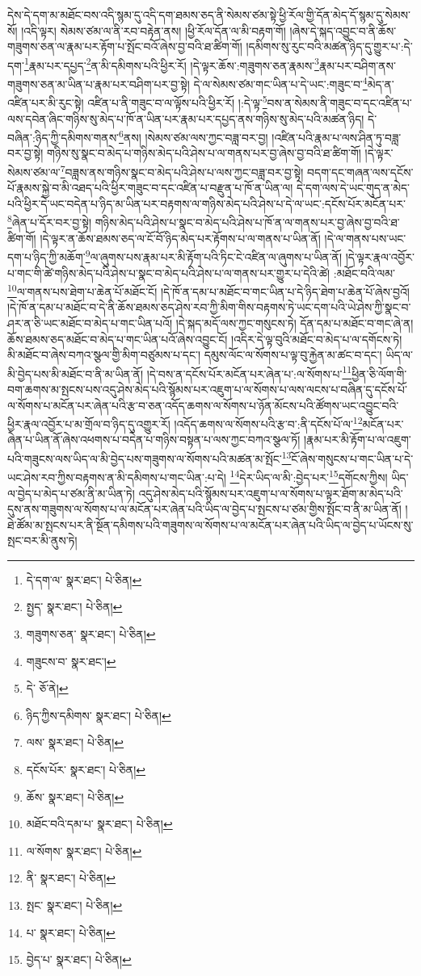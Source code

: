 དེས་དེ་དག་མ་མཐོང་བས་འདི་སྙམ་དུ་འདི་དག་ཐམས་ཅད་ནི་སེམས་ཙམ་སྟེ་ཕྱི་རོལ་གྱི་དོན་མེད་དོ་སྙམ་དུ་སེམས་སོ། །འདི་ལྟར། སེམས་ཙམ་ལ་ནི་རབ་བརྟེན་ནས། །ཕྱི་རོལ་དོན་ལ་མི་བརྟག་གོ། །ཞེས་དེ་སྐད་འབྱུང་བ་ནི་ཆོས་གཟུགས་ཅན་ལ་རྣམ་པར་རྟོག་པ་སྤོང་བའོ་ཞེས་བྱ་བའི་ཐ་ཚིག་གོ། །དམིགས་སུ་རུང་བའི་མཚན་ཉིད་དུ་གྱུར་པ་:དེ་དག་\footnote{དེ་དག་ལ་  སྣར་ཐང་།  པེ་ཅིན། }རྣམ་པར་དཔྱད་\footnote{སྤྱད་  སྣར་ཐང་།  པེ་ཅིན། }ན་མི་དམིགས་པའི་ཕྱིར་རོ། །དེ་ལྟར་ཆོས་:གཟུགས་ཅན་རྣམས་\footnote{གཟུགས་ཅན་  སྣར་ཐང་།  པེ་ཅིན། }རྣམ་པར་བཤིག་ནས་གཟུགས་ཅན་མ་ཡིན་པ་རྣམ་པར་བཤིག་པར་བྱ་སྟེ། དེ་ལ་སེམས་ཙམ་གང་ཡིན་པ་དེ་ཡང་:གཟུང་བ་\footnote{གཟུངས་བ་  སྣར་ཐང་། }མེད་ན་འཛིན་པར་མི་རུང་སྟེ། འཛིན་པ་ནི་གཟུང་བ་ལ་ལྟོས་པའི་ཕྱིར་རོ། །:དེ་ལྟ་\footnote{དེ་  ཅོ་ནེ། }བས་ན་སེམས་ནི་གཟུང་བ་དང་འཛིན་པ་ལས་དབེན་ཞིང་གཉིས་སུ་མེད་པ་ཁོ་ན་ཡིན་པར་རྣམ་པར་དཔྱད་ནས་གཉིས་སུ་མེད་པའི་མཚན་ཉིད། དེ་བཞིན་:ཉིད་ཀྱི་དམིགས་གནས་\footnote{ཉིད་ཀྱིས་དམིགས་  སྣར་ཐང་།  པེ་ཅིན། }ནས། །སེམས་ཙམ་ལས་ཀྱང་བཟླ་བར་བྱ། །འཛིན་པའི་རྣམ་པ་ལས་ཤིན་ཏུ་བཟླ་བར་བྱ་སྟེ། གཉིས་སུ་སྣང་བ་མེད་པ་གཉིས་མེད་པའི་ཤེས་པ་ལ་གནས་པར་བྱ་ཞེས་བྱ་བའི་ཐ་ཚིག་གོ། །དེ་ལྟར་སེམས་ཙམ་ལ་\footnote{ལས་  སྣར་ཐང་།  པེ་ཅིན། }བཟླས་ནས་གཉིས་སྣང་བ་མེད་པའི་ཤེས་པ་ལས་ཀྱང་བཟླ་བར་བྱ་སྟེ། བདག་དང་གཞན་ལས་དངོས་པོ་རྣམས་སྐྱེ་བ་མི་འཐད་པའི་ཕྱིར་གཟུང་བ་དང་འཛིན་པ་བརྫུན་པ་ཁོ་ན་ཡིན་ལ། དེ་དག་ལས་དེ་ཡང་གུད་ན་མེད་པའི་ཕྱིར་དེ་ཡང་བདེན་པ་ཉིད་མ་ཡིན་པར་བརྟགས་ལ་གཉིས་མེད་པའི་ཤེས་པ་དེ་ལ་ཡང་:དངོས་པོར་མངོན་པར་\footnote{དངོས་པོར་  སྣར་ཐང་།  པེ་ཅིན། }ཞེན་པ་དོར་བར་བྱ་སྟེ། གཉིས་མེད་པའི་ཤེས་པ་སྣང་བ་མེད་པའི་ཤེས་པ་ཁོ་ན་ལ་གནས་པར་བྱ་ཞེས་བྱ་བའི་ཐ་ཚིག་གོ། །དེ་ལྟར་ན་ཆོས་ཐམས་ཅད་ལ་ངོ་བོ་ཉིད་མེད་པར་རྟོགས་པ་ལ་གནས་པ་ཡིན་ནོ། །དེ་ལ་གནས་པས་ཡང་དག་པ་ཉིད་ཀྱི་མཆོག་\footnote{ཆོས་  སྣར་ཐང་།  པེ་ཅིན། }ལ་ཞུགས་པས་རྣམ་པར་མི་རྟོག་པའི་ཏིང་ངེ་འཛིན་ལ་ཞུགས་པ་ཡིན་ནོ། །དེ་ལྟར་རྣལ་འབྱོར་པ་གང་གི་ཚེ་གཉིས་མེད་པའི་ཤེས་པ་སྣང་བ་མེད་པའི་ཤེས་པ་ལ་གནས་པར་གྱུར་པ་དེའི་ཚེ། :མཐོང་བའི་ལམ་\footnote{མཐོང་བའི་དམ་པ་  སྣར་ཐང་།  པེ་ཅིན། }ལ་གནས་པས་ཐེག་པ་ཆེན་པོ་མཐོང་ངོ། །དེ་ཁོ་ན་དམ་པ་མཐོང་བ་གང་ཡིན་པ་དེ་ཉིད་ཐེག་པ་ཆེན་པོ་ཞེས་བྱའོ། །དེ་ཁོ་ན་དམ་པ་མཐོང་བ་དེ་ནི་ཆོས་ཐམས་ཅད་ཤེས་རབ་ཀྱི་མིག་གིས་བརྟགས་ཏེ་ཡང་དག་པའི་ཡེ་ཤེས་ཀྱི་སྣང་བ་ཤར་ན་ཅི་ཡང་མཐོང་བ་མེད་པ་གང་ཡིན་པའོ། །དེ་སྐད་མདོ་ལས་ཀྱང་གསུངས་ཏེ། དོན་དམ་པ་མཐོང་བ་གང་ཞེ་ན། ཆོས་ཐམས་ཅད་མཐོང་བ་མེད་པ་གང་ཡིན་པའོ་ཞེས་འབྱུང་ངོ། །འདིར་དེ་ལྟ་བུའི་མཐོང་བ་མེད་པ་ལ་དགོངས་ཏེ། མི་མཐོང་བ་ཞེས་བཀའ་སྩལ་གྱི་མིག་བཙུམས་པ་དང་། དམུས་ལོང་ལ་སོགས་པ་ལྟ་བུ་རྐྱེན་མ་ཚང་བ་དང་། ཡིད་ལ་མི་བྱེད་པས་མི་མཐོང་བ་ནི་མ་ཡིན་ནོ། །དེ་བས་ན་དངོས་པོར་མངོན་པར་ཞེན་པ་:ལ་སོགས་པ་\footnote{ལ་སོགས་  སྣར་ཐང་།  པེ་ཅིན། }ཕྱིན་ཅི་ལོག་གི་བག་ཆགས་མ་སྤངས་པས་འདུ་ཤེས་མེད་པའི་སྙོམས་པར་འཇུག་པ་ལ་སོགས་པ་ལས་ལངས་པ་བཞིན་དུ་དངོས་པོ་ལ་སོགས་པ་མངོན་པར་ཞེན་པའི་རྩ་བ་ཅན་འདོད་ཆགས་ལ་སོགས་པ་ཉོན་མོངས་པའི་ཚོགས་ཡང་འབྱུང་བའི་ཕྱིར་རྣལ་འབྱོར་པ་མ་གྲོལ་བ་ཉིད་དུ་འགྱུར་རོ། །འདོད་ཆགས་ལ་སོགས་པའི་རྩ་བ་:ནི་དངོས་པོ་ལ་\footnote{ནི་  སྣར་ཐང་།  པེ་ཅིན། }མངོན་པར་ཞེན་པ་ཡིན་ནོ་ཞེས་འཕགས་པ་བདེན་པ་གཉིས་བསྟན་པ་ལས་ཀྱང་བཀའ་སྩལ་ཏོ། །རྣམ་པར་མི་རྟོག་པ་ལ་འཇུག་པའི་གཟུངས་ལས་ཡིད་ལ་མི་བྱེད་པས་གཟུགས་ལ་སོགས་པའི་མཚན་མ་སྤོང་\footnote{སྤང་  སྣར་ཐང་།  པེ་ཅིན། }ངོ་ཞེས་གསུངས་པ་གང་ཡིན་པ་དེ་ཡང་ཤེས་རབ་ཀྱིས་བརྟགས་ན་མི་དམིགས་པ་གང་ཡིན་:པ་དེ། \footnote{པ་  སྣར་ཐང་།  པེ་ཅིན། }དེར་ཡིད་ལ་མི་:བྱེད་པར་\footnote{བྱེད་པ་  སྣར་ཐང་།  པེ་ཅིན། }དགོངས་ཀྱིས། ཡིད་ལ་བྱེད་པ་མེད་པ་ཙམ་ནི་མ་ཡིན་ཏེ། འདུ་ཤེས་མེད་པའི་སྙོམས་པར་འཇུག་པ་ལ་སོགས་པ་ལྟར་ཐོག་མ་མེད་པའི་དུས་ནས་གཟུགས་ལ་སོགས་པ་ལ་མངོན་པར་ཞེན་པའི་ཡིད་ལ་བྱེད་པ་སྤངས་པ་ཙམ་གྱིས་སྤོང་བ་ནི་མ་ཡིན་ནོ། །ཐེ་ཚོམ་མ་སྤངས་པར་ནི་སྔོན་དམིགས་པའི་གཟུགས་ལ་སོགས་པ་ལ་མངོན་པར་ཞེན་པའི་ཡིད་ལ་བྱེད་པ་ཡོངས་སུ་སྤང་བར་མི་ནུས་ཏེ། 